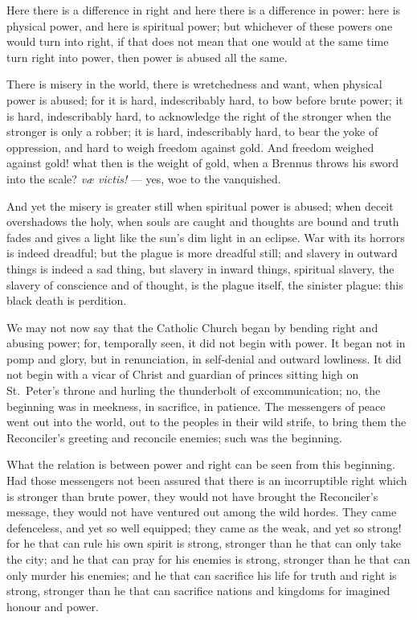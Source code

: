 \documentclass[12pt,a4paper,openany]{book}
\newcommand{\opage}[1]{\marginnote{\footnotesize\textit{[#1]}}}
\begin{document}
Here there is a difference in right and here there is a difference in power:
here is physical power, and here is spiritual power; but whichever
of these powers one would turn into right, if that does
not mean that one would at the same time turn right into
power, then power is abused all the same.

\opage{4}There is misery in the world, there is wretchedness and want,
when physical power is abused; for it is hard,
indescribably hard, to bow before brute power; it is hard,
indescribably hard, to acknowledge the right of the stronger when the
stronger is only a robber; it is hard, indescribably hard,
to bear the yoke of oppression, and hard to weigh freedom
against gold. And freedom weighed against gold! what then is the weight
of gold, when a Brennus throws his sword into the scale?
\textit{væ victis!} --- yes, woe to the vanquished.

And yet the misery is greater still when spiritual
power is abused; when deceit overshadows the
holy, when souls are caught and thoughts are bound and truth
fades and gives a light like the sun's dim light in an
eclipse. War with its horrors is indeed dreadful;
but the plague is more dreadful still; and slavery
in outward things is indeed a sad thing, but slavery in inward things,
spiritual slavery, the slavery of conscience and of thought,
is the plague itself, the sinister plague: this black death is perdition.

We may not now say that the Catholic Church began by
bending right and abusing power; for, temporally seen, it did not begin
with power. It began not in pomp
and glory, but in renunciation, in self-denial and outward
lowliness. It did not begin with a vicar of Christ
and guardian of princes sitting high on St.\ Peter's
throne and hurling the thunderbolt of excommunication; no, the beginning was
in meekness, in sacrifice, in patience. The messengers of peace
went out into the world, out to the peoples in their wild
strife, to bring them the Reconciler's greeting and reconcile enemies;
such was the beginning.

What the relation is between power and right can be seen from
this beginning. Had those messengers not been assured
that there is an incorruptible right which is stronger
than brute power, they would not have brought the Reconciler's
\opage{5}message, they would not have ventured out among the wild hordes. They
came defenceless, and yet so well equipped; they came as the
weak, and yet so strong! for he that can rule his own
spirit is strong, stronger than he that can only take the city;
and he that can pray for his enemies is strong, stronger than
he that can only murder his enemies; and he that can sacrifice
his life for truth and right is strong, stronger than he that
can sacrifice nations and kingdoms for imagined honour and power.
\end{document}
